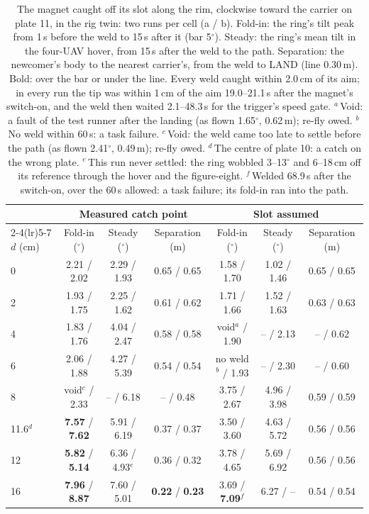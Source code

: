 \begin{table}[htbp]
\centering
\footnotesize
\setlength{\tabcolsep}{3pt}
\caption[The magnet caught off its slot, along the rim]{The magnet caught off its slot along the rim, clockwise toward
the carrier on plate 11, in the rig twin: two runs per cell (a / b). Fold-in: the ring's tilt peak from 1\,s before the
weld to 15\,s after it (bar 5$^\circ$). Steady: the ring's mean tilt in the four-UAV hover, from 15\,s after the weld to
the path. Separation: the newcomer's body to the nearest carrier's, from the weld to LAND (line 0.30\,m). Bold: over the
bar or under the line. Every weld caught within 2.0\,cm of its aim; in every run the tip was within 1\,cm of the aim
19.0--21.1\,s after the magnet's switch-on, and the weld then waited 2.1--48.3\,s for the trigger's speed gate.
$^a$\,Void: a fault of the test runner after the landing (as flown 1.65$^\circ$, 0.62\,m); re-fly owed. $^b$\,No weld
within 60\,s: a task failure. $^c$\,Void: the weld came too late to settle before the path (as flown 2.41$^\circ$,
0.49\,m); re-fly owed. $^d$\,The centre of plate 10: a catch on the wrong plate. $^e$\,This run never settled: the ring
wobbled 3--13$^\circ$ and 6--18\,cm off its reference through the hover and the figure-eight. $^f$\,Welded 68.9\,s after
the switch-on, over the 60\,s allowed: a task failure; its fold-in ran into the path.}
\label{tab:catch_rim}
\begin{tabular}{lcccccc}
\toprule
 & \multicolumn{3}{c}{Measured catch point} & \multicolumn{3}{c}{Slot assumed} \\
\cmidrule(lr){2-4}\cmidrule(lr){5-7}
$d$ (cm) & Fold-in ($^\circ$) & Steady ($^\circ$) & Separation (m) & Fold-in ($^\circ$) & Steady ($^\circ$) & Separation (m) \\
\midrule
0 & 2.21 / 2.02 & 2.29 / 1.93 & 0.65 / 0.65 & 1.58 / 1.70 & 1.02 / 1.46 & 0.65 / 0.65 \\
2 & 1.93 / 1.75 & 2.25 / 1.62 & 0.61 / 0.62 & 1.71 / 1.66 & 1.52 / 1.63 & 0.63 / 0.63 \\
4 & 1.83 / 1.76 & 4.04 / 2.47 & 0.58 / 0.58 & void$^a$ / 1.90 & -- / 2.13 & -- / 0.62 \\
6 & 2.06 / 1.88 & 4.27 / 5.39 & 0.54 / 0.54 & no weld$^b$ / 1.93 & -- / 2.30 & -- / 0.60 \\
8 & void$^c$ / 2.33 & -- / 6.18 & -- / 0.48 & 3.75 / 2.67 & 4.96 / 3.98 & 0.59 / 0.59 \\
11.6$^d$ & \textbf{7.57} / \textbf{7.62} & 5.91 / 6.19 & 0.37 / 0.37 & 3.50 / 3.60 & 4.63 / 5.72 & 0.56 / 0.56 \\
12 & \textbf{5.82} / \textbf{5.14} & 6.36 / 4.93$^e$ & 0.36 / 0.32 & 3.78 / 4.65 & 5.69 / 6.92 & 0.56 / 0.56 \\
16 & \textbf{7.96} / \textbf{8.87} & 7.60 / 5.01 & \textbf{0.22} / \textbf{0.23} & 3.69 / \textbf{7.09}$^f$ & 6.27 / -- & 0.54 / 0.54 \\
\bottomrule
\end{tabular}
\end{table}
